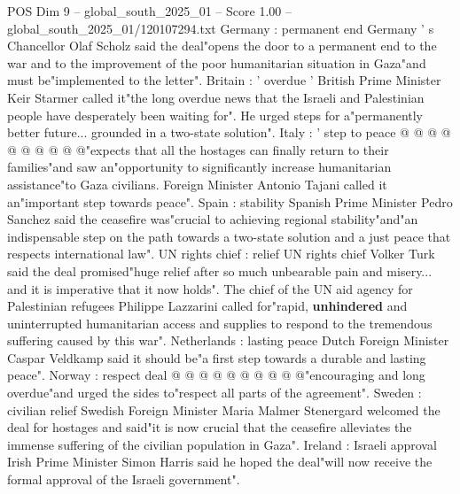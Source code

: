 \begin{textsample}{POS Dim 9 – global\_south\_2025\_01 – Score 1.00 – global\_south\_2025\_01/120107294.txt}
Germany : permanent end Germany ' s Chancellor Olaf Scholz said the deal"opens the door to a permanent end to the war and to the improvement of the poor humanitarian situation in Gaza"and must be"implemented to the letter".
Britain : ' overdue ' British Prime Minister Keir Starmer called it"the long overdue news that the Israeli and Palestinian people have desperately been waiting for".
He urged steps for a"permanently better future... grounded in a two-state solution".
Italy : ' step to peace @ @ @ @ @ @ @ @ @ @"expects that all the hostages can finally return to their families"and saw an"opportunity to significantly increase humanitarian assistance"to Gaza civilians.
Foreign Minister Antonio Tajani called it an"important step towards peace".
Spain : stability Spanish Prime Minister Pedro Sanchez said the ceasefire was"crucial to achieving regional stability"and"an indispensable step on the path towards a two-state solution and a just peace that respects international law".
UN rights chief : relief UN rights chief Volker Turk said the deal promised"huge relief after so much unbearable pain and misery... and it is imperative that it now holds".
The chief of the UN aid agency for Palestinian refugees Philippe Lazzarini called for"rapid, \textbf{unhindered} and uninterrupted humanitarian access and supplies to respond to the tremendous suffering caused by this war".
Netherlands : lasting peace Dutch Foreign Minister Caspar Veldkamp said it should be"a first step towards a durable and lasting peace".
Norway : respect deal @ @ @ @ @ @ @ @ @ @"encouraging and long overdue"and urged the sides to"respect all parts of the agreement".
Sweden : civilian relief Swedish Foreign Minister Maria Malmer Stenergard welcomed the deal for hostages and said"it is now crucial that the ceasefire alleviates the immense suffering of the civilian population in Gaza".
Ireland : Israeli approval Irish Prime Minister Simon Harris said he hoped the deal"will now receive the formal approval of the Israeli government".

\end{textsample}
